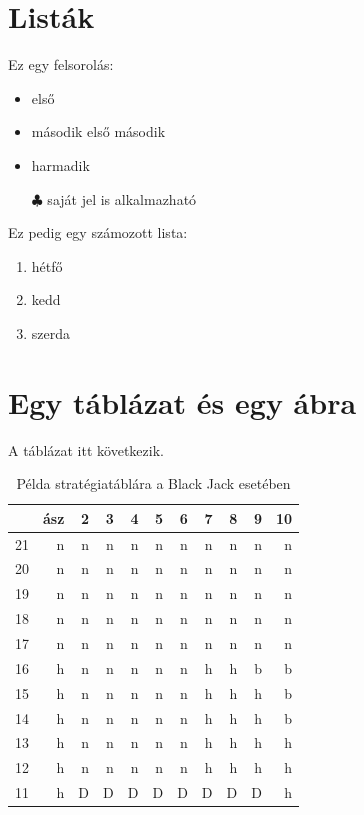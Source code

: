 \documentclass[12pt]{report}
\theoremstyle{definition}
\begin{document}
\section{Listák}

Ez egy felsorolás:
\begin{itemize}
    \item első
    \item második
      \subitem első
      \subitem második
    \item harmadik
    \item[$\clubsuit$]  saját jel is alkalmazható
\end{itemize}
Ez pedig egy számozott lista:
\begin{enumerate}
            \item hétfő
            \item kedd
            \item szerda
\end{enumerate}

\pagebreak


\section{Egy táblázat és egy ábra}

A táblázat itt következik.
\begin{table}[!h]\label{strategia}
\caption{Példa stratégiatáblára a Black Jack esetében}
\begin{center}
\begin{tabular}{l||r|r|r|r|r|r|r|r|r|r}
&ász&2&3&4&5&6&7&8&9&10\\
\hline\hline
21&n&n&n&n&n&n&n&n&n&n\\
20&n&n&n&n&n&n&n&n&n&n\\
19&n&n&n&n&n&n&n&n&n&n\\
18&n&n&n&n&n&n&n&n&n&n\\
17&n&n&n&n&n&n&n&n&n&n\\
16&h&n&n&n&n&n&h&h&b&b\\
15&h&n&n&n&n&n&h&h&h&b\\
14&h&n&n&n&n&n&h&h&h&b\\
13&h&n&n&n&n&n&h&h&h&h\\
12&h&n&n&n&n&n&h&h&h&h\\
11&h&D&D&D&D&D&D&D&D&h\\
\end{tabular}
\end{center}
\end{table}
\end{document}
